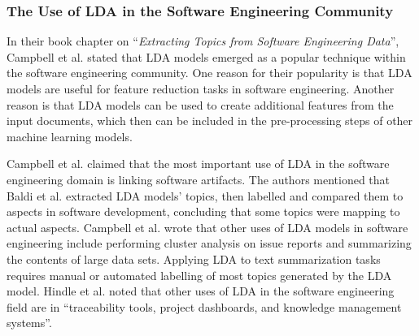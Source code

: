         \subsubsection{The Use of LDA in the Software Engineering Community}
            In their book chapter on ``\emph{Extracting Topics from Software Engineering Data}'', Campbell et al. \cite{campbell2015latent} stated that LDA models emerged as a popular technique within the software engineering community. One reason for their popularity is that LDA models are useful for feature reduction tasks in software engineering. Another reason is that LDA models can be used to create additional features from the input documents, which then can be included in the pre-processing steps of other machine learning models. 
            
            Campbell et al. \cite{campbell2015latent} claimed that the most important use of LDA in the software engineering domain is linking software artifacts. The authors mentioned that Baldi et al. \cite{baldi2008theory} extracted LDA models' topics, then labelled and compared them to aspects in software development, concluding that some topics were mapping to actual aspects. Campbell et al. \cite{campbell2015latent} wrote that other uses of LDA models in software engineering include performing cluster analysis on issue reports and summarizing the contents of large data sets. Applying LDA to text summarization tasks requires manual or automated labelling of most topics generated by the LDA model. Hindle et al. \cite{hindle2012relating} noted that other uses of LDA in the software engineering field are in ``traceability tools, project dashboards, and knowledge management systems''.
            
            
                
                
                
                
        
